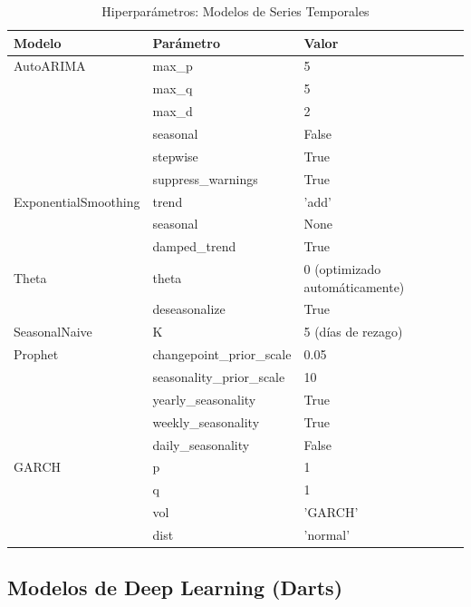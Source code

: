 \begin{table}[htbp]
\centering
\caption{Hiperpar\'ametros: Modelos de Series Temporales}
\label{tab:hyper_ts}
\small
\begin{tabular}{@{}llp{7cm}@{}}
\toprule
\textbf{Modelo} & \textbf{Par\'ametro} & \textbf{Valor} \\
\midrule
AutoARIMA & max\_p & 5 \\
 & max\_q & 5 \\
 & max\_d & 2 \\
 & seasonal & False \\
 & stepwise & True \\
 & suppress\_warnings & True \\
\midrule
ExponentialSmoothing & trend & 'add' \\
 & seasonal & None \\
 & damped\_trend & True \\
\midrule
Theta & theta & 0 (optimizado autom\'aticamente) \\
 & deseasonalize & True \\
\midrule
SeasonalNaive & K & 5 (d\'ias de rezago) \\
\midrule
Prophet & changepoint\_prior\_scale & 0.05 \\
 & seasonality\_prior\_scale & 10 \\
 & yearly\_seasonality & True \\
 & weekly\_seasonality & True \\
 & daily\_seasonality & False \\
\midrule
GARCH & p & 1 \\
 & q & 1 \\
 & vol & 'GARCH' \\
 & dist & 'normal' \\
\bottomrule
\end{tabular}
\end{table}

\subsection{Modelos de Deep Learning (Darts)}
\label{app:dl_hyperparams}

